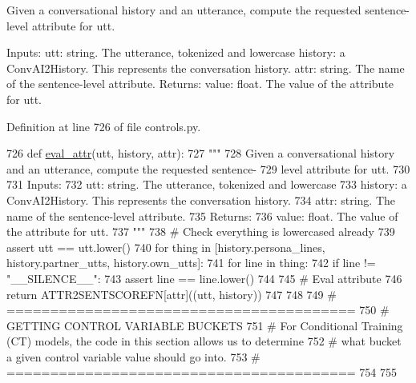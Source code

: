 \begin{DoxyVerb}Given a conversational history and an utterance, compute the requested sentence-
level attribute for utt.

Inputs:
    utt: string. The utterance, tokenized and lowercase
    history: a ConvAI2History. This represents the conversation history.
    attr: string. The name of the sentence-level attribute.
Returns:
    value: float. The value of the attribute for utt.
\end{DoxyVerb}
 

Definition at line 726 of file controls.\+py.


\begin{DoxyCode}
726 \textcolor{keyword}{def }\hyperlink{namespaceprojects_1_1controllable__dialogue_1_1controllable__seq2seq_1_1controls_afc2b447cbf1dcb4a754d080d2e611c24}{eval\_attr}(utt, history, attr):
727     \textcolor{stringliteral}{"""}
728 \textcolor{stringliteral}{    Given a conversational history and an utterance, compute the requested sentence-}
729 \textcolor{stringliteral}{    level attribute for utt.}
730 \textcolor{stringliteral}{}
731 \textcolor{stringliteral}{    Inputs:}
732 \textcolor{stringliteral}{        utt: string. The utterance, tokenized and lowercase}
733 \textcolor{stringliteral}{        history: a ConvAI2History. This represents the conversation history.}
734 \textcolor{stringliteral}{        attr: string. The name of the sentence-level attribute.}
735 \textcolor{stringliteral}{    Returns:}
736 \textcolor{stringliteral}{        value: float. The value of the attribute for utt.}
737 \textcolor{stringliteral}{    """}
738     \textcolor{comment}{# Check everything is lowercased already}
739     \textcolor{keyword}{assert} utt == utt.lower()
740     \textcolor{keywordflow}{for} thing \textcolor{keywordflow}{in} [history.persona\_lines, history.partner\_utts, history.own\_utts]:
741         \textcolor{keywordflow}{for} line \textcolor{keywordflow}{in} thing:
742             \textcolor{keywordflow}{if} line != \textcolor{stringliteral}{"\_\_SILENCE\_\_"}:
743                 \textcolor{keyword}{assert} line == line.lower()
744 
745     \textcolor{comment}{# Eval attribute}
746     \textcolor{keywordflow}{return} ATTR2SENTSCOREFN[attr]((utt, history))
747 
748 
749 \textcolor{comment}{# ========================================}
750 \textcolor{comment}{# GETTING CONTROL VARIABLE BUCKETS}
751 \textcolor{comment}{# For Conditional Training (CT) models, the code in this section allows us to determine}
752 \textcolor{comment}{# what bucket a given control variable value should go into.}
753 \textcolor{comment}{# ========================================}
754 
755 
\end{DoxyCode}
